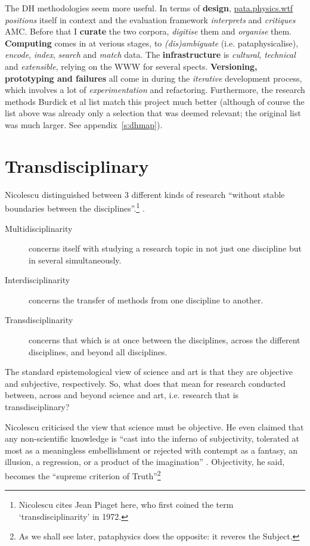 The \ac{DH} methodologies seem more useful. In terms of \textbf{design}, \url{pata.physics.wtf} \textit{positions} itself in context and the evaluation framework \textit{interprets} and \textit{critiques} \ac{AMC}. Before that I \textbf{curate} the two corpora, \textit{digitise} them and \textit{organise} them. \textbf{Computing} comes in at verious stages, to \textit{(dis)ambiguate} (i.e. pataphysicalise), \textit{encode}, \textit{index}, \textit{search} and \textit{match} data. The \textbf{infrastructure} is \textit{cultural}, \textit{technical} and \textit{extensible}, relying on the \ac{WWW} for several spects. \textbf{Versioning, prototyping and failures} all come in during the \textit{iterative} development process, which involves a lot of \textit{experimentation} and refactoring. Furthermore, the research methods Burdick et al \autocite*{Burdick2012} list match this project much better (although of course the list above was already only a selection that was deemed relevant; the original list was much larger. See appendix~\ref{s:dhmap}).


\section{Transdisciplinary}

Nicolescu distinguished between 3 different kinds of research ``without stable boundaries between the disciplines''.\footnote{Nicolescu cites Jean Piaget here, who first coined the term `transdisciplinarity' in 1972.} \autocite*{Nicolescu2010}.

\begin{description}
  \item [Multidisciplinarity]	concerns itself with studying a research topic in not just one discipline but in several simultaneously.
  \item [Interdisciplinarity]	concerns the transfer of methods from one discipline to another.
  \item [Transdisciplinarity]	concerns that which is at once between the disciplines, across the different disciplines, and beyond all disciplines.
\end{description}

The standard epistemological view of science and art is that they are objective and subjective, respectively. So, what does that mean for research conducted between, across and beyond science and art, i.e. research that is transdisciplinary?

Nicolescu criticised the view that science must be objective. He even claimed that any non-scientific knowledge is ``cast into the inferno of subjectivity, tolerated at most as a meaningless embellishment or rejected with contempt as a fantasy, an illusion, a regression, or a product of the imagination'' \autocite*{Nicolescu2010}. Objectivity, he said, becomes the ``supreme criterion of Truth''\footnote{As we shall see later, pataphysics does the opposite: it reveres the Subject.}

